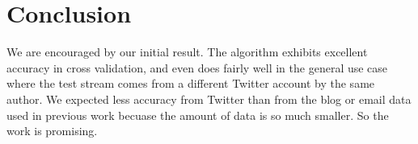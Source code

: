 \documentclass[10pt, conference, compsocconf]{IEEEtran}
\begin{document}
\section{Conclusion}

We are encouraged by our initial result. The algorithm exhibits
excellent accuracy in cross validation, and even does fairly well in
the general use case where the test stream comes from a different
Twitter account by the same author. We expected less accuracy from
Twitter than from the blog or email data used in previous work becuase
the amount of data is so much smaller. So the work is promising.

%
%



%
%
\end{document}
